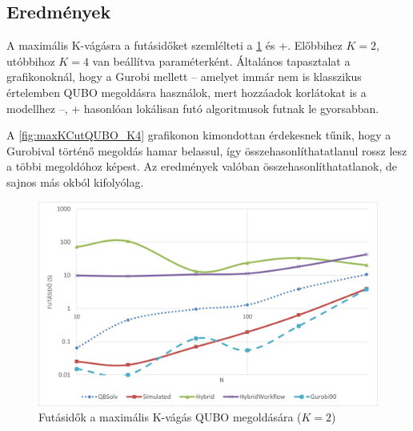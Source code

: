 \subsection{Eredmények}


A maximális K-vágásra a futásidőket szemlélteti a \ref{fig:maxKCutQUBO_K2} és \az+. Előbbihez $K=2$, utóbbihoz $K=4$ van beállítva paraméterként. Általános tapasztalat a grafikonoknál, hogy a Gurobi mellett -- amelyet immár nem is klasszikus értelemben QUBO megoldásra használok, mert hozzáadok korlátokat is a modellhez --, \az+ hasonlóan lokálisan futó algoritmusok futnak le gyorsabban.

A \ref{fig:maxKCutQUBO_K4} grafikonon kimondottan érdekesnek tűnik, hogy a Gurobival történő megoldás hamar belassul, így összehasonlíthatatlanul rossz lesz a többi megoldóhoz képest. Az eredmények valóban összehasonlíthatatlanok, de sajnos más okból kifolyólag.

\begin{figure}[!ht]
	\centering
	\includegraphics[width=150mm, keepaspectratio]{figures/diagrams/maxKCutQUBO_K2.png}
	\caption{Futásidők a maximális K-vágás QUBO megoldására ($K=2$)}
	\label{fig:maxKCutQUBO_K2}
\end{figure}

